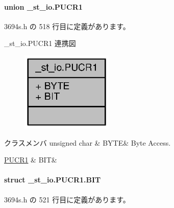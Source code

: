 \paragraph{union \+\_\+st\+\_\+io.\+P\+U\+C\+R1}


 3694s.\+h の 518 行目に定義があります。



\+\_\+st\+\_\+io.\+P\+U\+C\+R1 連携図
\nopagebreak
\begin{figure}[H]
\begin{center}
\leavevmode
\includegraphics[width=124pt]{d6/da8/union__st__io_8PUCR1__coll__graph}
\end{center}
\end{figure}
\begin{DoxyFields}{クラスメンバ}
unsigned char\label{3694s_8h_ae409eb2ba6eb6801f52763ae370c350e}
&
B\+Y\+T\+E&
Byte Access. \\
\hline

\hyperlink{3694s_8h_d8/d14/struct__st__io_8PUCR1_8BIT}{P\+U\+C\+R1}\label{3694s_8h_adb957fdc8000e1eef04a243f5199aa52}
&
B\+I\+T&
\\
\hline

\end{DoxyFields}
\label{struct__st__io_8PUCR1_8BIT}
\paragraph{struct \+\_\+st\+\_\+io.\+P\+U\+C\+R1.\+B\+I\+T}


 3694s.\+h の 521 行目に定義があります。



